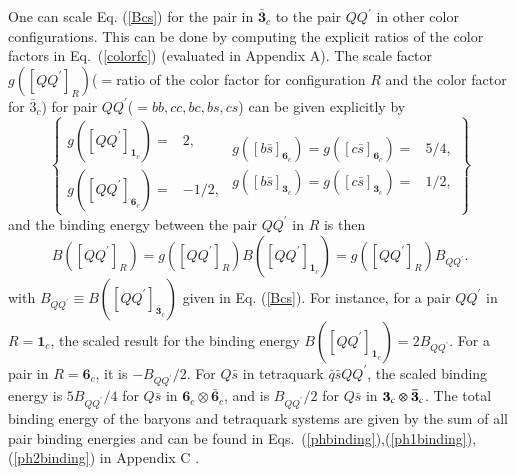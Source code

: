 \documentclass[prd,twocolumn,floatfix,nofootinbib]{revtex4}
\begin{document}
One can scale Eq. (\ref{Bcs}) for the pair in $\boldsymbol{\bar{3}}_{c}$ to
the pair $QQ^{\prime }$ in other color configurations. This can be done by
computing the explicit ratios of the color factors in Eq.~(\ref{colorfc})
(evaluated in Appendix A). The scale factor $g([QQ^{\prime }]_{R})$($=$ratio
of the color factor for configuration $R$ and the color factor for $\bar{3}%
_{c}$) for pair $QQ^{\prime }$($=bb,cc,bc,bs,cs$) can be given explicitly by
\begin{equation}
\left\{
\begin{array}{cc}
g([QQ^{\prime }]_{\boldsymbol{1}_{c}})= & 2, \\
g([QQ^{\prime }]_{\boldsymbol{6}_{c}})= & -1/2,%
\end{array}%
\begin{array}{cc}
g([b\bar{s}]_{\boldsymbol{6}_{c}})=g([c\bar{s}]_{\boldsymbol{6}_{c}})= & 5/4,
\\
g([b\bar{s}]_{\boldsymbol{3}_{c}})=g([c\bar{s}]_{\boldsymbol{3}_{c}})= & 1/2,%
\end{array}%
\right\}  \label{gf}
\end{equation}%
and the binding energy between the pair $QQ^{\prime }$ in $R$ is then
\begin{equation}
B([QQ^{\prime }]_{R})=g([QQ^{\prime }]_{R})B([QQ^{\prime }]_{\boldsymbol{1}%
_{c}})=g([QQ^{\prime }]_{R})B_{QQ^{\prime }}\text{.}  \label{BQQR}
\end{equation}%
with $B_{QQ^{\prime }}\equiv B([QQ^{\prime }]_{\boldsymbol{\bar{3}}_{c}})$
given in Eq. (\ref{Bcs}). For instance, for a pair $QQ^{\prime }$ in $R=%
\boldsymbol{1}_{c}$, the scaled result for the binding energy $B([QQ^{\prime
}]_{\boldsymbol{1}_{c}})=2B_{QQ^{\prime }}$. For a pair in $R=\boldsymbol{6}%
_{c}$, it is $-B_{QQ^{\prime }}/2$. For $Q\bar{s}$ in tetraquark $\bar{q}%
\bar{s}QQ^{\prime }$, the scaled binding energy is $5B_{QQ^{\prime }}/4$ for
$Q\bar{s}$ in $\boldsymbol{6}_{c}\otimes \boldsymbol{\bar{6}}_{c}$, and is $%
B_{QQ^{\prime }}/2$ for $Q\bar{s}$ in $\boldsymbol{3}_{c}\otimes \boldsymbol{%
\bar{3}}_{c}$. The total binding energy of the baryons and tetraquark
systems are given by the sum of all pair binding energies and can be found
in Eqs.~(\ref{phbinding}),(\ref{ph1binding}),(\ref{ph2binding}) in Appendix
C .
\end{document}

